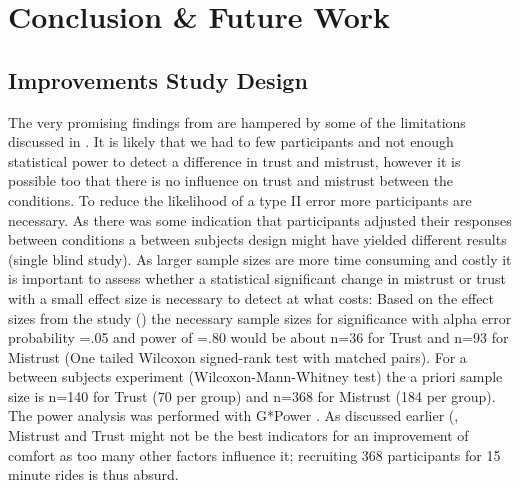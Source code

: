 \chapter{Conclusion \& Future Work}
\label{ch:conclusion}
\section{Improvements Study Design}
\label{ImproveStudy}
The very promising findings from  are hampered by some of the limitations discussed in . It is likely that we had to few participants and not enough statistical power to detect a difference in trust and mistrust, however it is possible too that there is no influence on trust and mistrust between the conditions. To reduce the likelihood of a type II error more participants are necessary. As there was some indication that participants adjusted their responses between conditions a between subjects design might have yielded different results (single blind study). 
As larger sample sizes are more time consuming and costly it is important to assess whether a statistical significant change in mistrust or trust with a small effect size is necessary to detect at what costs:  Based on the effect sizes from the study () the necessary sample sizes for significance with alpha error probability =.05 and power of =.80 would be about n=36 for Trust and n=93 for Mistrust (One tailed Wilcoxon signed-rank test with matched pairs). For a between subjects experiment (Wilcoxon-Mann-Whitney test) the a priori sample size is n=140 for Trust (70 per group) and n=368 for Mistrust (184 per group). The power analysis was performed with G*Power \cite{Faul2007GPower:Sciences.}. As discussed earlier (,  Mistrust and Trust might not be the best indicators for an improvement of comfort as too many other factors influence it; recruiting 368 participants for 15 minute rides is thus absurd. 

